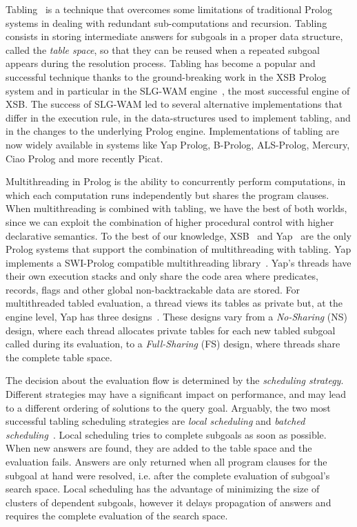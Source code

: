 \documentclass{llncs}
\begin{document}
Tabling~\cite{Chen-96} is a technique that overcomes some limitations
of traditional Prolog systems in dealing with redundant
sub-computations and recursion. Tabling consists in storing
intermediate answers for subgoals in a proper data structure, called
the \emph{table space}, so that they can be reused when a repeated
subgoal appears during the resolution process. Tabling has become a
popular and successful technique thanks to the ground-breaking work in
the XSB Prolog system and in particular in the SLG-WAM
engine~\cite{Sagonas-98}, the most successful engine of XSB. The
success of SLG-WAM led to several alternative implementations that
differ in the execution rule, in the data-structures used to implement
tabling, and in the changes to the underlying Prolog
engine. Implementations of tabling are now widely available in systems
like Yap Prolog, B-Prolog, ALS-Prolog, Mercury, Ciao Prolog and more
recently Picat.

Multithreading in Prolog is the ability to concurrently perform
computations, in which each computation runs independently but shares
the program clauses. When multithreading is combined with tabling, we
have the best of both worlds, since we can exploit the combination of
higher procedural control with higher declarative semantics. To the
best of our knowledge, XSB~\cite{Marques-08} and Yap~\cite{Areias-12a}
are the only Prolog systems that support the combination of
multithreading with tabling. Yap implements a SWI-Prolog compatible
multithreading library~\cite{Wielemaker-03}. Yap's threads have their
own execution stacks and only share the code area where predicates,
records, flags and other global non-backtrackable data are stored. For
multithreaded tabled evaluation, a thread views its tables as private
but, at the engine level, Yap has three
designs~\cite{Areias-12a}. These designs vary from a \emph{No-Sharing}
(NS) design, where each thread allocates private tables for each new
tabled subgoal called during its evaluation, to a \emph{Full-Sharing}
(FS) design, where threads share the complete table space.

The decision about the evaluation flow is determined by the
\emph{scheduling strategy}. Different strategies may have a
significant impact on performance, and may lead to a different
ordering of solutions to the query goal. Arguably, the two most
successful tabling scheduling strategies are \emph{local scheduling}
and \emph{batched scheduling}~\cite{Freire-96}. Local scheduling tries
to complete subgoals as soon as possible. When new answers are found,
they are added to the table space and the evaluation fails. Answers
are only returned when all program clauses for the subgoal at hand
were resolved, i.e. after the complete evaluation of subgoal's search
space. Local scheduling has the advantage of minimizing the size of
clusters of dependent subgoals, however it delays propagation of
answers and requires the complete evaluation of the search
space. 
\end{document}
